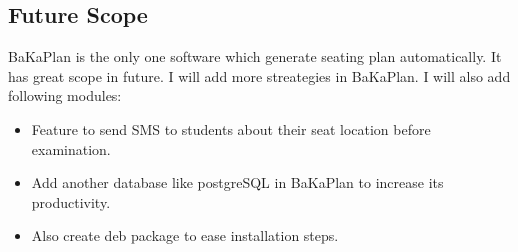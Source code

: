 
\newpage 
\subsection{Future Scope}

BaKaPlan is the only one software which generate seating plan
automatically. It has great scope in future. I will add more
streategies in BaKaPlan. I will also add following modules: 
\begin{itemize}
\item Feature to send SMS to students about their seat location before
examination.
\item Add another database like postgreSQL in BaKaPlan to increase its
productivity.
\item Also create deb package to ease installation steps.
\end{itemize}
